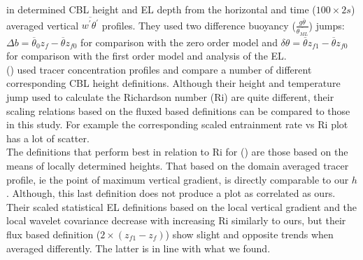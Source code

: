 \citeauthor{FedConzMir04} in \cite{FedConzMir04} determined \acs{CBL} height and \acs{EL} depth from the horizontal and time ($100 \times 2s$) averaged vertical $\overline{w^{'}\theta^{'}}$ profiles.  They used two difference buoyancy ($\frac{g\overline{\theta}}{\overline{\theta_{ML}}}$) jumps: $\Delta b = \overline{\theta}_{0}z_{f} - \overline{\theta}z_{f0}$ for comparison with the zero order model and $\delta \theta = \overline{\theta}z_{f1} - \overline{\theta}z_{f0}$ for comparison with the first order model and analysis of the \acs{EL}.\\  



\citeauthor{BrooksFowler2} (\cite{BrooksFowler2}) used tracer concentration profiles and compare a number of different corresponding \acs{CBL} height definitions.  Although their height and temperature jump used to calculate the Richardson number (\acs{Ri}) are quite different, their scaling relations based on the fluxed based definitions can be compared to those in this study. For example the corresponding scaled entrainment rate vs \acs{Ri} plot has a lot of scatter.\\

The definitions that perform best in relation to \acs{Ri} for \citeauthor{BrooksFowler2} (\cite{BrooksFowler2}) are those based on the means of locally determined heights.  That based on the domain averaged tracer profile, ie the point of maximum vertical gradient, is directly comparable to our $h$. Although, this last definition does not produce a plot as correlated as ours.\\  

Their scaled statistical \acs{EL} definitions based on the local vertical gradient and the local wavelet covariance decrease with increasing \acs{Ri} similarly to ours, but their flux based definition ($2\times(z_{f1}-z_{f})$) show slight and opposite trends when averaged differently.  The latter is in line with what we found.\\



